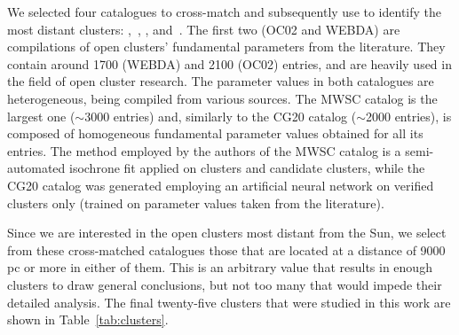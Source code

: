 \documentclass[draft]{aa}
\begin{document}
 We selected four catalogues to cross-match and subsequently use to identify the
 most distant clusters: \citet[][New Catalog of Optically Visible Open Clusters
 and Candidates, hereinafter OC02]{Dias_2002},~\citet[][hereinafter
 WEBDA\footnote{\url{https://webda.physics.muni.cz/}}]{Netopil_2012},
 \citet[][Milky Way Star Clusters Catalog, hereinafter MWSC]{Kharchenko_2012},
 and~\citet[][hereinafter CG20]{Cantat_2020}.
 The first two (OC02 and WEBDA) are compilations of open clusters' fundamental
 parameters from the literature. They contain around 1700 (WEBDA) and 2100 
 (OC02) entries, and are heavily used in the field of open cluster research.
 The parameter values in both catalogues are heterogeneous, being compiled from
 various sources.
 The MWSC catalog is the largest one ($\sim$3000 entries) and, similarly to the
 CG20 catalog ($\sim$2000 entries), is composed of homogeneous fundamental
 parameter values obtained for all its entries.
 The method employed by the authors of the MWSC catalog is a semi-automated
 isochrone fit applied on clusters and candidate clusters, while the
 CG20 catalog was generated employing an artificial neural network on
 verified clusters only (trained on parameter values taken from the
 literature).

 Since we are interested in the open clusters most distant from the Sun, we
 select from these cross-matched catalogues those that are located at a
 distance of 9000 pc or more in either of them. This is an arbitrary value that
 results in enough clusters to draw general conclusions, but not too many that
 would impede their detailed analysis. The final twenty-five clusters that were
 studied in this work are shown in Table~\ref{tab:clusters}.\\
\end{document}

